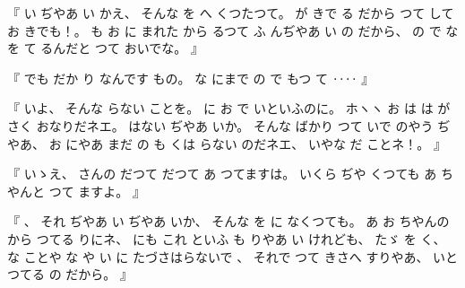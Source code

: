 %
『
い
ぢやあ
い
かえ、
%
そんな
を
へ
くつたつて。
%
が
きで
る
だから
つて
して
お
きでも！。
%
も
お
に
まれた
から
るつて
ふ
んぢやあ
い
の
だから、
%
の
で
な
を
て
るんだと
つて
おいでな。
』

%
『
でも
だか
り
なんです
もの。
%
な
にまで
の
で%
もつ
て
‥‥
』

%
『
いよ、
%
そんな
らない
ことを。
%
に
お
で
いといふのに。
%
ホヽヽ
お
は
は
が
さく
おなりだネエ。
%
はない
ぢやあ
いか。
%
そんな
ばかり
つて
いで
のやう
ぢやあ、
%
お
にやあ
まだ
の
も
くは
らない
のだネエ、
%
いやな
だ
ことネ！。
』

%
『
いゝえ、
%
さんの
だつて
だつて
あ
つてますは。
%
%
いくら
ぢや
くつても
あ
ちやんと
つて
ますよ。
』

%
『
、
%
それ
ぢやあ
い
ぢやあ
いか、
%
そんな
を
に
なくつても。
%
あ
お
ちやんの
から
つてる
りにネ、
%
にも
これ
といふ
も
りやあ
い
けれども、
%
たゞ
を
く、
%
な
ことや
な
や
い
に
たづさはらないで
、
%
%
それで
つて%
きさへ
すりやあ、
%
いと
つてる
の
だから。
』

